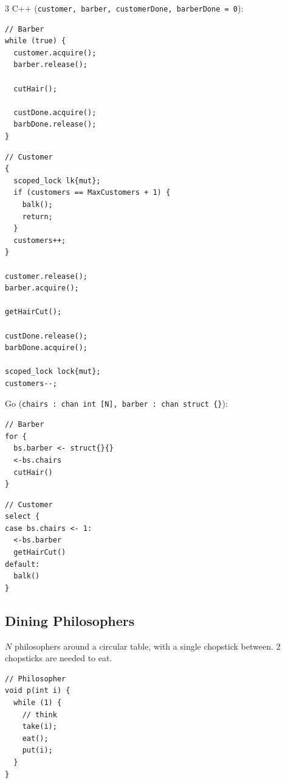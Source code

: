 \documentclass[12pt, a4paper]{article}
\begin{document}
\begin{multicols*}{3}
C++ (\lstinline|customer, barber, customerDone, barberDone = 0|):\\
\begin{minipage}{0.48\columnwidth}
\begin{lstlisting}[style=cpp,basicstyle=\ttfamily\scriptsize]
// Barber
while (true) {
  customer.acquire();
  barber.release();

  cutHair();

  custDone.acquire();
  barbDone.release();
}
\end{lstlisting}
\end{minipage}
\begin{minipage}{0.48\columnwidth}
\begin{lstlisting}[style=cpp,basicstyle=\ttfamily\scriptsize]
// Customer
{
  scoped_lock lk{mut};
  if (customers == MaxCustomers + 1) {
    balk();
    return;
  }
  customers++;
}

customer.release();
barber.acquire();

getHairCut();

custDone.release();
barbDone.acquire();

scoped_lock lock{mut};
customers--;
\end{lstlisting}
\end{minipage}

Go (\lstinline[style=go]|chairs : chan int [N], barber : chan struct {}|):\\
\begin{minipage}{0.48\columnwidth}
\begin{lstlisting}[style=go,basicstyle=\ttfamily\scriptsize]
// Barber
for {
  bs.barber <- struct{}{}
  <-bs.chairs
  cutHair()
}
\end{lstlisting}
\end{minipage}
\begin{minipage}{0.48\columnwidth}
\begin{lstlisting}[style=go,basicstyle=\ttfamily\scriptsize]
// Customer
select {
case bs.chairs <- 1:
  <-bs.barber
  getHairCut()
default:
  balk()
}
\end{lstlisting}
\end{minipage}

\colbreak
\subsection{Dining Philosophers}
$N$ philosophers around a circular table, with a single chopstick between. $2$ chopsticks are needed to eat.
\begin{minipage}{0.48\columnwidth}
  \begin{lstlisting}
// Philosopher
void p(int i) {
  while (1) {
    // think
    take(i);
    eat();
    put(i);
  }
}


\end{lstlisting}
\end{minipage}
\end{multicols*}
\end{document}
